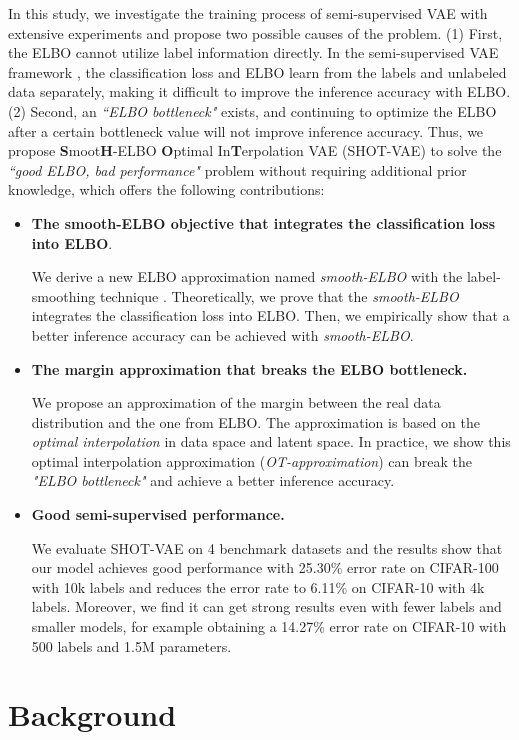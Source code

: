 \documentclass[letterpaper]{article}
\begin{document}
In this study, we investigate the training process of semi-supervised VAE with extensive experiments and propose two possible causes of the problem. (1) First, the ELBO cannot utilize label information directly. In the semi-supervised VAE framework \citep{DBLP:conf/nips/KingmaMRW14}, the classification loss and ELBO learn from the labels and unlabeled data separately, making it difficult to improve the inference accuracy with ELBO. (2) Second, an \textit{``ELBO bottleneck"} exists, and continuing to optimize the ELBO after a certain bottleneck value will not improve inference accuracy. Thus, we propose \textbf{S}moot\textbf{H}-ELBO \textbf{O}ptimal 
In\textbf{T}erpolation VAE (SHOT-VAE) to solve the \textit{``good ELBO, bad performance"} problem without requiring additional prior knowledge, which offers the following contributions:
\begin{itemize}
    \item \textbf{The smooth-ELBO objective that integrates the classification loss into ELBO}. 
    
        We derive a new ELBO approximation named \textit{smooth-ELBO} with the label-smoothing technique \citep{DBLP:conf/nips/MullerKH19}. Theoretically, we prove that the \textit{smooth-ELBO} integrates the classification loss into ELBO. Then, we empirically show that a better inference accuracy can be achieved with \textit{smooth-ELBO}.
    
    \item \textbf{The margin approximation that breaks the ELBO bottleneck.}
    
    We propose an approximation of the margin between the real data distribution and the one from ELBO. The approximation is based on the \textit{optimal interpolation} in data space and latent space. In practice, we show this optimal interpolation approximation (\textit{OT-approximation}) can break the \textit{"ELBO bottleneck"} and achieve a better inference accuracy.
    
    \item \textbf{Good semi-supervised performance.}
    
    We evaluate SHOT-VAE on 4 benchmark datasets and the results show that our model achieves good performance with 25.30\% error rate on CIFAR-100 with 10k labels and reduces the error rate to 6.11\% on CIFAR-10 with 4k labels. Moreover, we find it can get strong results even with fewer labels and smaller models, for example obtaining a 14.27\% error rate on CIFAR-10 with 500 labels and 1.5M parameters.
\end{itemize} \section{Background}
\label{sec:background}
\end{document}
